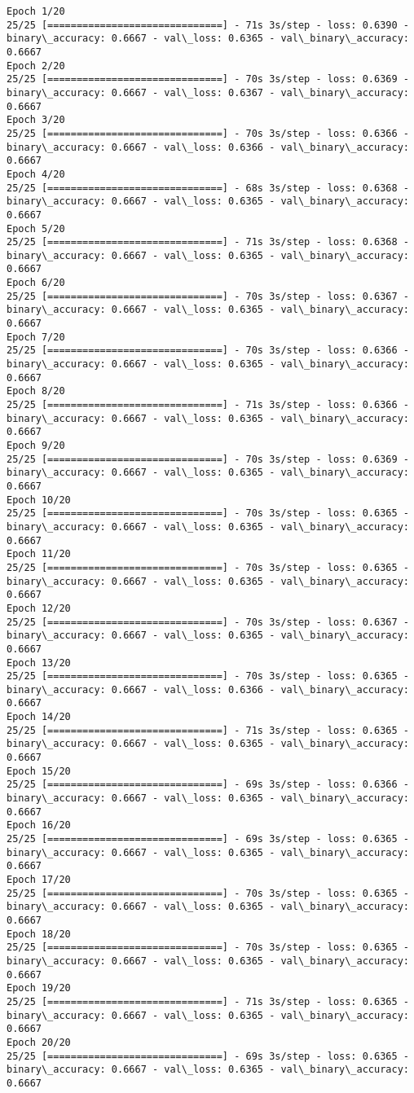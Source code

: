 \documentclass[11pt]{article}
\begin{document}
    \begin{Verbatim}[commandchars=\\\{\}]
Epoch 1/20
25/25 [==============================] - 71s 3s/step - loss: 0.6390 -
binary\_accuracy: 0.6667 - val\_loss: 0.6365 - val\_binary\_accuracy: 0.6667
Epoch 2/20
25/25 [==============================] - 70s 3s/step - loss: 0.6369 -
binary\_accuracy: 0.6667 - val\_loss: 0.6367 - val\_binary\_accuracy: 0.6667
Epoch 3/20
25/25 [==============================] - 70s 3s/step - loss: 0.6366 -
binary\_accuracy: 0.6667 - val\_loss: 0.6366 - val\_binary\_accuracy: 0.6667
Epoch 4/20
25/25 [==============================] - 68s 3s/step - loss: 0.6368 -
binary\_accuracy: 0.6667 - val\_loss: 0.6365 - val\_binary\_accuracy: 0.6667
Epoch 5/20
25/25 [==============================] - 71s 3s/step - loss: 0.6368 -
binary\_accuracy: 0.6667 - val\_loss: 0.6365 - val\_binary\_accuracy: 0.6667
Epoch 6/20
25/25 [==============================] - 70s 3s/step - loss: 0.6367 -
binary\_accuracy: 0.6667 - val\_loss: 0.6365 - val\_binary\_accuracy: 0.6667
Epoch 7/20
25/25 [==============================] - 70s 3s/step - loss: 0.6366 -
binary\_accuracy: 0.6667 - val\_loss: 0.6365 - val\_binary\_accuracy: 0.6667
Epoch 8/20
25/25 [==============================] - 71s 3s/step - loss: 0.6366 -
binary\_accuracy: 0.6667 - val\_loss: 0.6365 - val\_binary\_accuracy: 0.6667
Epoch 9/20
25/25 [==============================] - 70s 3s/step - loss: 0.6369 -
binary\_accuracy: 0.6667 - val\_loss: 0.6365 - val\_binary\_accuracy: 0.6667
Epoch 10/20
25/25 [==============================] - 70s 3s/step - loss: 0.6365 -
binary\_accuracy: 0.6667 - val\_loss: 0.6365 - val\_binary\_accuracy: 0.6667
Epoch 11/20
25/25 [==============================] - 70s 3s/step - loss: 0.6365 -
binary\_accuracy: 0.6667 - val\_loss: 0.6365 - val\_binary\_accuracy: 0.6667
Epoch 12/20
25/25 [==============================] - 70s 3s/step - loss: 0.6367 -
binary\_accuracy: 0.6667 - val\_loss: 0.6365 - val\_binary\_accuracy: 0.6667
Epoch 13/20
25/25 [==============================] - 70s 3s/step - loss: 0.6365 -
binary\_accuracy: 0.6667 - val\_loss: 0.6366 - val\_binary\_accuracy: 0.6667
Epoch 14/20
25/25 [==============================] - 71s 3s/step - loss: 0.6365 -
binary\_accuracy: 0.6667 - val\_loss: 0.6365 - val\_binary\_accuracy: 0.6667
Epoch 15/20
25/25 [==============================] - 69s 3s/step - loss: 0.6366 -
binary\_accuracy: 0.6667 - val\_loss: 0.6365 - val\_binary\_accuracy: 0.6667
Epoch 16/20
25/25 [==============================] - 69s 3s/step - loss: 0.6365 -
binary\_accuracy: 0.6667 - val\_loss: 0.6365 - val\_binary\_accuracy: 0.6667
Epoch 17/20
25/25 [==============================] - 70s 3s/step - loss: 0.6365 -
binary\_accuracy: 0.6667 - val\_loss: 0.6365 - val\_binary\_accuracy: 0.6667
Epoch 18/20
25/25 [==============================] - 70s 3s/step - loss: 0.6365 -
binary\_accuracy: 0.6667 - val\_loss: 0.6365 - val\_binary\_accuracy: 0.6667
Epoch 19/20
25/25 [==============================] - 71s 3s/step - loss: 0.6365 -
binary\_accuracy: 0.6667 - val\_loss: 0.6365 - val\_binary\_accuracy: 0.6667
Epoch 20/20
25/25 [==============================] - 69s 3s/step - loss: 0.6365 -
binary\_accuracy: 0.6667 - val\_loss: 0.6365 - val\_binary\_accuracy: 0.6667
    \end{Verbatim}
\end{document}
